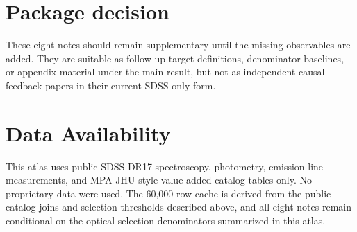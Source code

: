 \documentclass[twocolumn]{aastex631}
\begin{document}
\section{Package decision}
These eight notes should remain supplementary until the missing observables are added. They are suitable as follow-up target definitions, denominator baselines, or appendix material under the main result, but not as independent causal-feedback papers in their current SDSS-only form.

\section*{Data Availability}
This atlas uses public SDSS DR17 spectroscopy, photometry, emission-line measurements, and MPA-JHU-style value-added catalog tables only. No proprietary data were used. The 60,000-row cache is derived from the public catalog joins and selection thresholds described above, and all eight notes remain conditional on the optical-selection denominators summarized in this atlas.

\end{document}
